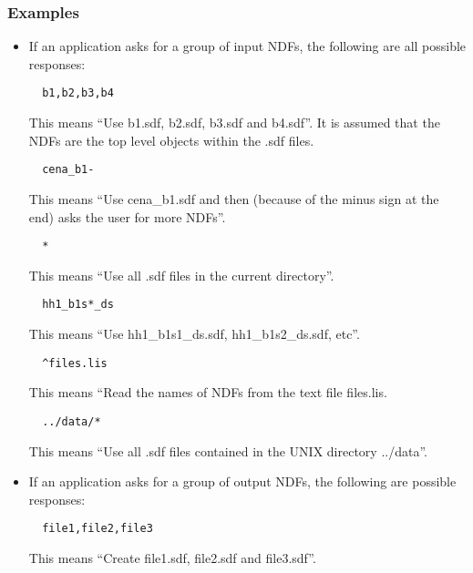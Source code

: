 \subsubsection{Examples}
\begin{itemize}
\item If an application asks for a group of input {\small NDF}s, the following
are all possible responses:

\small
\begin{verbatim}
  b1,b2,b3,b4
\end{verbatim}
\normalsize
\vspace{-3mm}
This means ``Use b1.sdf, b2.sdf, b3.sdf and b4.sdf''. It is  assumed that the
{\small NDF}s are the top level objects  within the .sdf files.

\small
\begin{verbatim}
  cena_b1-
\end{verbatim}
\normalsize
\vspace{-3mm}
This means ``Use cena\_b1.sdf and then (because of the minus sign at the end)
asks the user for  more {\small NDF}s''.

\small
\begin{verbatim}
  *
\end{verbatim}
\normalsize
\vspace{-3mm}
This means ``Use all .sdf files in the current directory''.

\small
\begin{verbatim}
  hh1_b1s*_ds
\end{verbatim}
\normalsize
\vspace{-3mm}
This means ``Use hh1\_b1s1\_ds.sdf, hh1\_b1s2\_ds.sdf, etc''.

\small
\begin{verbatim}
  ^files.lis
\end{verbatim}
\normalsize
\vspace{-3mm}
This means ``Read the names of {\small NDF}s from the text file files.lis.

\small
\begin{verbatim}
  ../data/*
\end{verbatim}
\normalsize
\vspace{-3mm}
This means ``Use all .sdf files contained in the {\small UNIX} directory
../data''.

\item If an application asks for a group of output {\small NDF}s, the following
are possible responses:

\small
\begin{verbatim}
  file1,file2,file3
\end{verbatim}
\normalsize
\vspace{-3mm}
This means ``Create file1.sdf, file2.sdf and file3.sdf''.


\end{itemize}
